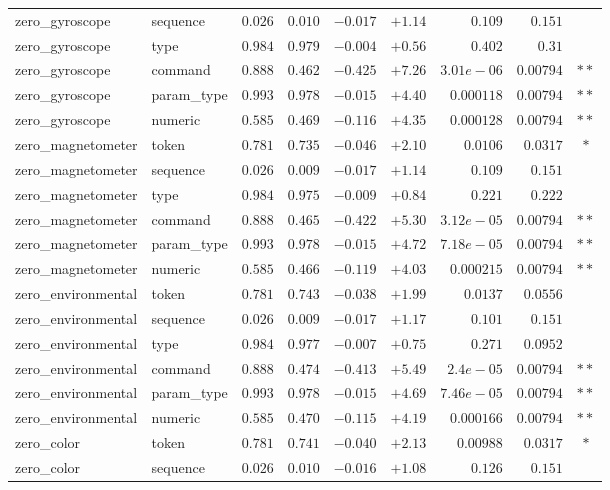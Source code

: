 \begin{table}[h]
\begin{tabular}{l l r r r r r r c}
zero\_gyroscope & sequence & $0.026$ & $0.010$ & $-0.017$ & $+1.14$ & $0.109$ & $0.151$ &  \\
zero\_gyroscope & type & $0.984$ & $0.979$ & $-0.004$ & $+0.56$ & $0.402$ & $0.31$ &  \\
zero\_gyroscope & command & $0.888$ & $0.462$ & $-0.425$ & $+7.26$ & $3.01e-06$ & $0.00794$ & $\ast\ast$ \\
zero\_gyroscope & param\_type & $0.993$ & $0.978$ & $-0.015$ & $+4.40$ & $0.000118$ & $0.00794$ & $\ast\ast$ \\
zero\_gyroscope & numeric & $0.585$ & $0.469$ & $-0.116$ & $+4.35$ & $0.000128$ & $0.00794$ & $\ast\ast$ \\
zero\_magnetometer & token & $0.781$ & $0.735$ & $-0.046$ & $+2.10$ & $0.0106$ & $0.0317$ & $\ast$ \\
zero\_magnetometer & sequence & $0.026$ & $0.009$ & $-0.017$ & $+1.14$ & $0.109$ & $0.151$ &  \\
zero\_magnetometer & type & $0.984$ & $0.975$ & $-0.009$ & $+0.84$ & $0.221$ & $0.222$ &  \\
zero\_magnetometer & command & $0.888$ & $0.465$ & $-0.422$ & $+5.30$ & $3.12e-05$ & $0.00794$ & $\ast\ast$ \\
zero\_magnetometer & param\_type & $0.993$ & $0.978$ & $-0.015$ & $+4.72$ & $7.18e-05$ & $0.00794$ & $\ast\ast$ \\
zero\_magnetometer & numeric & $0.585$ & $0.466$ & $-0.119$ & $+4.03$ & $0.000215$ & $0.00794$ & $\ast\ast$ \\
zero\_environmental & token & $0.781$ & $0.743$ & $-0.038$ & $+1.99$ & $0.0137$ & $0.0556$ &  \\
zero\_environmental & sequence & $0.026$ & $0.009$ & $-0.017$ & $+1.17$ & $0.101$ & $0.151$ &  \\
zero\_environmental & type & $0.984$ & $0.977$ & $-0.007$ & $+0.75$ & $0.271$ & $0.0952$ &  \\
zero\_environmental & command & $0.888$ & $0.474$ & $-0.413$ & $+5.49$ & $2.4e-05$ & $0.00794$ & $\ast\ast$ \\
zero\_environmental & param\_type & $0.993$ & $0.978$ & $-0.015$ & $+4.69$ & $7.46e-05$ & $0.00794$ & $\ast\ast$ \\
zero\_environmental & numeric & $0.585$ & $0.470$ & $-0.115$ & $+4.19$ & $0.000166$ & $0.00794$ & $\ast\ast$ \\
zero\_color & token & $0.781$ & $0.741$ & $-0.040$ & $+2.13$ & $0.00988$ & $0.0317$ & $\ast$ \\
zero\_color & sequence & $0.026$ & $0.010$ & $-0.016$ & $+1.08$ & $0.126$ & $0.151$ &  \\

\end{tabular}
\end{table}
